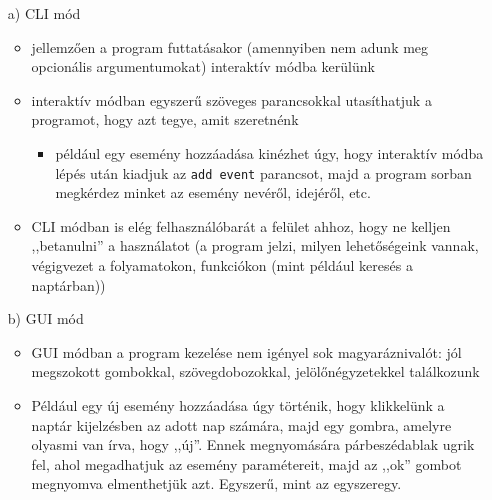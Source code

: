 \documentclass[a4paper]{article}
\begin{document}
	\begin{itemize}
		\item[a)] CLI mód
			\begin{itemize}
				\item jellemzően a program futtatásakor (amennyiben nem adunk meg opcionális argumentumokat) interaktív módba kerülünk
				\item interaktív módban egyszerű szöveges parancsokkal utasíthatjuk a programot, hogy azt tegye, amit szeretnénk
					\begin{itemize}
						\item például egy esemény hozzáadása kinézhet úgy, hogy interaktív módba lépés után kiadjuk az \texttt{add event} parancsot, majd a program sorban megkérdez minket az esemény nevéről, idejéről, etc.
					\end{itemize}
				\item CLI módban is elég felhasználóbarát a felület ahhoz, hogy ne kelljen ,,betanulni'' a használatot (a program jelzi, milyen lehetőségeink vannak, végigvezet a folyamatokon, funkciókon (mint például keresés a naptárban))
			\end{itemize}
		\item[b)] GUI mód
			\begin{itemize}
				\item GUI módban a program kezelése nem igényel sok magyaráznivalót: jól megszokott gombokkal, szövegdobozokkal, jelölőnégyzetekkel találkozunk
				\item Például egy új esemény hozzáadása úgy történik, hogy klikkelünk a naptár kijelzésben az adott nap számára, majd egy gombra, amelyre olyasmi van írva, hogy ,,új''. Ennek megnyomására párbeszédablak ugrik fel, ahol megadhatjuk az esemény paramétereit, majd az ,,ok'' gombot megnyomva elmenthetjük azt. Egyszerű, mint az egyszeregy.
			\end{itemize}	
	\end{itemize}
	


	
\end{document}
